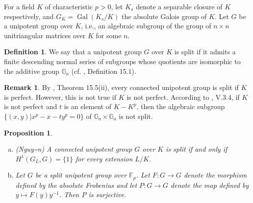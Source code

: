 \documentclass[sn-mathphys-num]{sn-jnl}
\numberwithin{equation}{section}
\theoremstyle{plain}
\newtheorem{prop}[theo]{Proposition}
\theoremstyle{definition}
\newtheorem{defi}[theo]{Definition}
\newtheorem{rema}[theo]{Remark}
\begin{document}
For a field $K$ of characteristic $p>0$, let $K_s$ denote a separable closure of $K$ respectively, and $G_K=\operatorname{Gal}(K_s/K)$ the absolute Galois group of $K$. Let $G$ be a unipotent group over $K$, i.e., an algebraic subgroup of the group of $n\times n$ unitriangular matrices over $K$ for some $n$. 

\begin{defi}
  We say that a unipotent group $G$ over $K$ is split if it admits a finite descending normal series of subgroups whose quotients are isomorphic to the additive group $\mathbb{G}_a$ (cf. \cite{Bo}, Definition 15.1).
\end{defi}

\begin{rema}
  By \cite{Bo}, Theorem 15.5(ii), every connected unipotent group is split if $K$ is perfect. However, this is not true if $K$ is not perfect. According to \cite{Oe}, V.3.4, if $K$ is not perfect and $t$ is an element of $K-K^p$, then the algebraic subgroup $\{(x,y)|x^p-x-ty^p=0\}$ of $\mathbb{G}_a\times\mathbb{G}_a$ is not split.
\end{rema}

\begin{prop}\label{lq}
\begin{enumerate}[(a)]
  \item\label{lq-1} ({\selectfont Nguy\~\ecircumflex{}n}) \cite{Ng} A connected unipotent group $G$ over $K$ is split if and only if $H^1(G_L,G)=\{1\}$ for every extension $L/K$.
  \item\label{lq-2} Let $G$ be a split unipotent group over $\mathbb{F}_p$. Let $F:G\to G$ denote the morphism defined by the absolute Frobenius and let $P:G\to G$ denote the map defined by $y\mapsto F(y)y^{-1}$. Then $P$ is surjective.
 \end{enumerate}
\end{prop}
\end{document}
